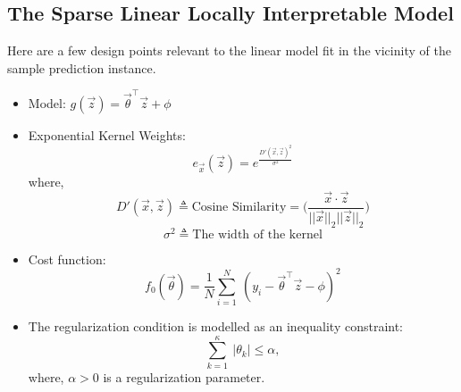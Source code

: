 \documentclass{article}
\begin{document}
\subsection{The Sparse Linear Locally Interpretable Model}
Here are a few design points relevant to the linear model fit in the vicinity of the sample prediction instance.
\begin{itemize}
    \item Model: $g(\vec{z}) = \vec{\theta}^\intercal \vec{z} + \phi$
    \item Exponential Kernel Weights:
    \begin{equation}\label{1}
        e_{\vec{x}}(\vec{z}) = e^{\frac{D'(\vec{x}, \vec{z})^2}{\sigma^2}}
    \end{equation}
    where,
    \begin{equation}\label{2}
        D'(\vec{x}, \vec{z}) \triangleq \text{Cosine Similarity} = \Big(\frac{\vec{x} \cdot \vec{z}}{||\vec{x}||_2 ||\vec{z}||_2}\Big)
    \end{equation}
    \[\sigma^2 \triangleq \text{The width of the kernel}\]
    \item Cost function:
    \begin{equation}\label{3}
        f_0(\vec{\theta}) = \frac{1}{N} \sum_{i=1}^N\ (y_i - \vec{\theta}^\intercal \vec{z} - \phi)^2
    \end{equation}
    \item The regularization condition is modelled as an inequality constraint:
    \begin{equation}\label{4}
        \sum_{k=1}^{\kappa}\ |\theta_k| \leq \alpha,
    \end{equation}
    where, $\alpha > 0$ is a regularization parameter.
\end{itemize}
\end{document}
